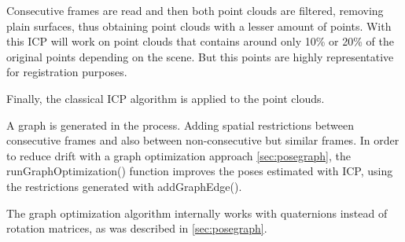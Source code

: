 Consecutive frames are read and then both point clouds are filtered, removing plain surfaces, thus obtaining point clouds 
with a lesser amount of points. With this ICP will work on point clouds that contains around 
only 10\% or 20\% of the original points depending on the scene. But this points are highly representative for registration purposes.

Finally, the classical ICP algorithm is applied to the point clouds.

A graph is generated in the process. Adding spatial restrictions between consecutive frames and also between non-consecutive but similar 
frames. In order to reduce drift with a graph optimization approach \ref{sec:posegraph}, the runGraphOptimization() function 
improves the poses estimated with 
 ICP, using the restrictions generated with addGraphEdge(). 


The graph optimization algorithm internally works with quaternions instead of rotation matrices, as was described in \ref{sec:posegraph}.

